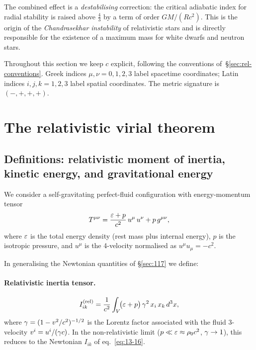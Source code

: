 The combined effect is a \emph{destabilising} correction: the critical
adiabatic index for radial stability is raised above $\tfrac{4}{3}$
by a term of order $GM/(Rc^{2})$.  This is the origin of the
\emph{Chandrasekhar instability} of relativistic stars and is directly
responsible for the existence of a maximum mass for white dwarfs and
neutron stars.

Throughout this section we keep $c$ explicit, following the conventions
of~\S\ref{sec:rel-conventions}.  Greek indices
$\mu,\nu = 0,1,2,3$ label spacetime coordinates; Latin indices
$i,j,k = 1,2,3$ label spatial coordinates.  The metric signature is
$(-,+,+,+)$.


\section{The relativistic virial theorem}
\label{sec:rel-117}

\subsection{Definitions: relativistic moment of inertia, kinetic energy,
  and gravitational energy}
\label{sec:rel-117-defs}

We consider a self-gravitating perfect-fluid configuration with
energy-momentum tensor
\begin{equation}
\label{eq:rel-13-EMT}
T^{\mu\nu} = \frac{\varepsilon + p}{c^{2}}\,u^{\mu}\,u^{\nu}
  + p\,g^{\mu\nu},
\end{equation}
where $\varepsilon$ is the total energy density (rest mass plus internal
energy), $p$ is the isotropic pressure, and $u^{\mu}$ is the
4-velocity normalised as $u^{\mu}u_{\mu} = -c^{2}$.

In generalising the Newtonian quantities of \S\ref{sec:117} we define:

\paragraph{Relativistic inertia tensor.}
\begin{equation}
\label{eq:rel-13-Iik}
I_{ik}^{(\mathrm{rel})}
  = \frac{1}{c^{2}}\int_{V}\!
    \bigl(\varepsilon + p\bigr)\,\gamma^{2}\,x_{i}\,x_{k}\,d^{3}x,
\end{equation}
where $\gamma = (1 - v^{2}/c^{2})^{-1/2}$ is the Lorentz factor
associated with the fluid 3-velocity $v^{i} = u^{i}/(\gamma c)$.  In the
non-relativistic limit ($p \ll \varepsilon \approx \rho_0 c^{2}$,
$\gamma \to 1$), this reduces to the Newtonian $I_{ik}$ of
eq.~\eqref{eq:13-16}.

